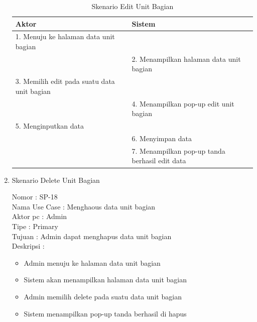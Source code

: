 \begin{enumerate}
\begin{itemize}
\end{itemize}

\begin{table}
	\caption{Skenario Edit Unit Bagian}
	\centering
	\begin{tabular}{ | p{55mm} | p{70mm} |}
		\hline 
		\textbf{Aktor} & \textbf{Sistem} \\
		\hline
		
		1.	Menuju ke halaman data unit bagian &  \\
		
		\hline
		
		&  2.	Menampilkan halaman data unit bagian \\
		
		\hline
		
		3. Memilih edit pada suatu data unit bagian & \\
		
		\hline
		
		& 4.	Menampilkan pop-up edit unit bagian \\
		
		\hline
		
		5.	Menginputkan data  & \\
		\hline
		
		& 6.	Menyimpan data \\
		\hline
		
		& 7.	Menampilkan pop-up tanda berhasil edit data \\
		\hline
		
	\end{tabular}
\end{table}

\item Skenario Delete Unit Bagian

Nomor \kern 3.6pc : SP-18 \\
Nama Use Case : Menghaous data unit bagian \\
Aktor  pc : Admin \\
Tipe \kern 4.6pc : Primary \\
Tujuan \kern 3.6pc : Admin dapat menghapus data unit bagian \\
Deskripsi \kern 2.5pc : 

\begin{itemize}
	\item Admin menuju ke halaman data unit bagian
	\item Sistem akan menampilkan halaman data unit bagian
	\item Admin memilih delete pada suatu data unit bagian
	\item Sistem menampilkan pop-up tanda berhasil di hapus
	

\end{itemize}
\end{enumerate}
